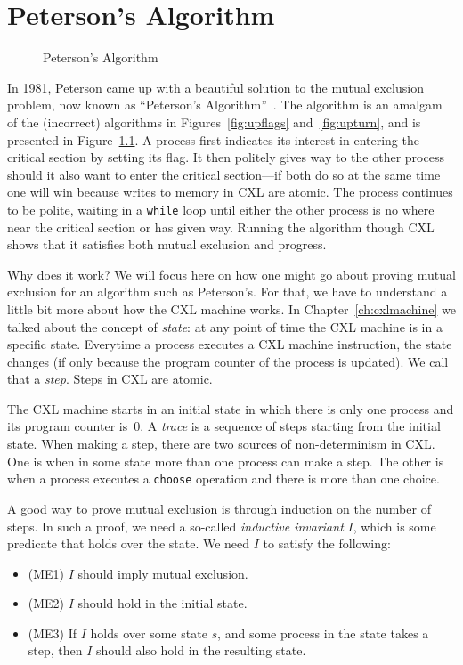 \documentclass{report}
\newenvironment{code}{
\tcolorbox
}{
\endtcolorbox
}
\begin{document}
\chapter{Peterson's Algorithm}

\begin{figure}
\begin{code}

\end{code}
\caption{Peterson's Algorithm}
\label{fig:peterson}
\end{figure}

In 1981, Peterson came up with a beautiful solution to the mutual exclusion
problem, now known as ``Peterson's Algorithm''~\cite{Peterson81}.
The algorithm is an amalgam of the (incorrect) algorithms in
Figures~\ref{fig:upflags} and~\ref{fig:upturn}, and is presented
in Figure~\ref{fig:peterson}.
A process first indicates its interest in entering the critical section
by setting its flag.
It then politely gives way to the other process should it also want to
enter the critical section---if both do so at the same time one will
win because writes to memory in CXL are atomic.
The process continues to be polite, waiting in a \texttt{while} loop
until either the other process is no where near the critical section
or has given way.
Running the algorithm though CXL shows that it satisfies both mutual
exclusion and progress.

Why does it work?  We will focus here on how one might go about proving
mutual exclusion for an algorithm such as Peterson's.
For that, we have to understand a little bit more about how the CXL
machine works.
In Chapter~\ref{ch:cxlmachine} we talked about the concept of \emph{state}:
at any point of time the CXL machine is in a specific state.
Everytime a process executes a CXL machine instruction, the
state changes (if only because the program counter of the process is
updated).  We call that a \emph{step}.  Steps in CXL are atomic.

The CXL machine starts in an initial state in which there is only
one process and its program counter is~0.  A \emph{trace} is a
sequence of steps starting from the initial state.  When making a
step, there are two sources of non-determinism in CXL.  One is when
in some state more than one process can make a step.  The other is
when a process executes a \texttt{choose} operation and there is
more than one choice.

A good way to prove mutual exclusion is through induction on
the number of steps.
In such a proof, we need a so-called
\emph{inductive invariant} $I$, which is some predicate that holds
over the state.  We need $I$ to satisfy the following:
\begin{itemize}
\item (ME1) $I$ should imply mutual exclusion.
\item (ME2) $I$ should hold in the initial state.
\item (ME3) If $I$ holds over some state $s$, and some process in the
state takes a step, then $I$ should also hold in the resulting state.
\end{itemize}
\end{document}
